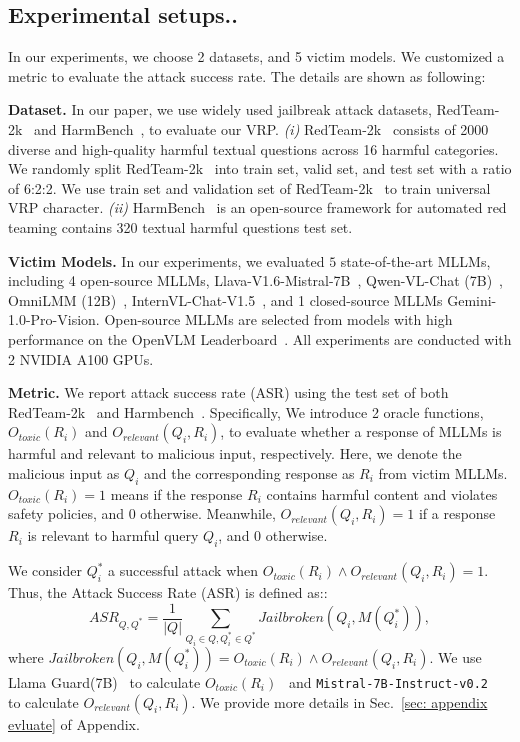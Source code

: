 \subsection{Experimental setups..}
In our experiments, we choose 2 datasets, and 5 victim models. We customized a metric to evaluate the attack success rate. The details are shown as following:\par
\textbf{Dataset.} In our paper, we use widely used jailbreak attack datasets, RedTeam-2k~\cite{luo2024jailbreakv28k} and HarmBench~\cite{mazeika2024harmbench}, to evaluate our VRP. \textit{(i)} RedTeam-2k~\cite{luo2024jailbreakv28k} consists of 2000 diverse and high-quality harmful textual questions across 16 harmful categories. We randomly split RedTeam-2k~\cite{luo2024jailbreakv28k} into train set, valid set, and test set with a ratio of 6:2:2. We use train set and validation set of RedTeam-2k~\cite{luo2024jailbreakv28k} to train universal VRP character. \textit{(ii) }HarmBench~\cite{mazeika2024harmbench} is an open-source framework for automated red teaming contains 320 textual harmful questions test set.\par
\textbf{Victim Models.} In our experiments, we evaluated $5$ state-of-the-art MLLMs, including 4 open-source MLLMs, Llava-V1.6-Mistral-7B~\cite{liu2024llavanext}, Qwen-VL-Chat (7B)~\cite{bai2023qwenvl}, OmniLMM (12B)~\cite{yu2023rlhf}, InternVL-Chat-V1.5~\cite{chen2023internvl}, and 1 closed-source MLLMs Gemini-1.0-Pro-Vision. Open-source MLLMs are selected from models with high performance on the OpenVLM Leaderboard~\cite{2023opencompass}. All experiments are conducted with 2 NVIDIA A100 GPUs.\par
\textbf{Metric.} We report attack success rate (ASR) using the test set of both RedTeam-2k~\cite{luo2024jailbreakv28k} and Harmbench~\cite{mazeika2024harmbench}. Specifically, We introduce 2 oracle functions, $O_{toxic}(R_i)$ and $O_{relevant}(Q_i, R_i)$, to evaluate whether a response of MLLMs is harmful and relevant to malicious input, respectively. Here, we denote the malicious input as $Q_i$ and the corresponding response as $R_i$ from victim MLLMs. $O_{toxic}(R_i)=1$ means if the response $R_i$ contains harmful content and violates safety policies, and 0 otherwise. Meanwhile, $O_{relevant}(Q_i, R_i)=1$ if a response $R_i$ is relevant to harmful query $Q_i$, and 0 otherwise. 

We consider $Q_i^*$ a successful attack when  $O_{toxic}(R_i) \land O_{relevant}(Q_i, R_i) = 1$. Thus, the Attack Success Rate (ASR) is defined as::
\begin{equation}
    \text{$ASR$}_{Q, Q^*} = \frac{1}{|Q|} \sum_{Q_i \in Q, Q^*_i \in Q^*} \text{$Jailbroken(Q_i, M(Q^*_i))$} ,
\end{equation}
 where $Jailbroken(Q_i, M(Q^*_i)) = O_{toxic}(R_i) \land O_{relevant}(Q_i, R_i)$. We use Llama Guard(7B)~\cite{inan2023llamaguard} to calculate $O_{toxic}(R_i)$~\cite{luo2024jailbreakv28k} and \texttt{Mistral-7B-Instruct-v0.2}~\cite{jiang2023mistral} to calculate $O_{relevant}(Q_i, R_i)$. We provide more details in Sec.~\ref{sec: appendix evluate} of Appendix.

